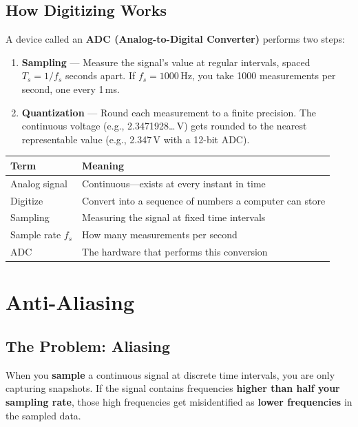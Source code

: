 \documentclass[12pt,a4paper]{article}
\begin{document}
\subsection{How Digitizing Works}

A device called an \textbf{ADC (Analog-to-Digital Converter)} performs two steps:

\begin{enumerate}
    \item \textbf{Sampling} --- Measure the signal's value at regular intervals, spaced $T_s = 1/f_s$ seconds apart. If $f_s = 1000$\,Hz, you take 1000 measurements per second, one every 1\,ms.

    \item \textbf{Quantization} --- Round each measurement to a finite precision. The continuous voltage (e.g., 2.3471928\ldots\,V) gets rounded to the nearest representable value (e.g., 2.347\,V with a 12-bit ADC).
\end{enumerate}

\begin{keybox}
\centering
\begin{tabular}{ll}
    \toprule
    \textbf{Term} & \textbf{Meaning} \\
    \midrule
    Analog signal & Continuous---exists at every instant in time \\
    Digitize & Convert into a sequence of numbers a computer can store \\
    Sampling & Measuring the signal at fixed time intervals \\
    Sample rate $f_s$ & How many measurements per second \\
    ADC & The hardware that performs this conversion \\
    \bottomrule
\end{tabular}
\end{keybox}

\section{Anti-Aliasing}

\subsection{The Problem: Aliasing}

When you \textbf{sample} a continuous signal at discrete time intervals, you are only capturing snapshots. If the signal contains frequencies \textbf{higher than half your sampling rate}, those high frequencies get misidentified as \textbf{lower frequencies} in the sampled data.
\end{document}
